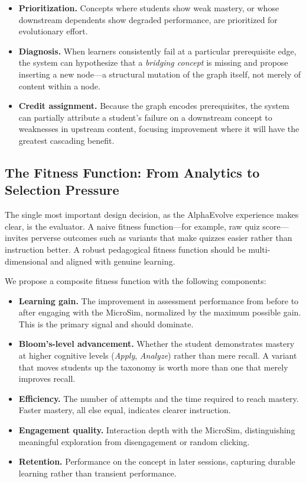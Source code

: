 \begin{itemize}
    \item \textbf{Prioritization.} Concepts where students show weak mastery,
          or whose downstream dependents show degraded performance, are
          prioritized for evolutionary effort.
    \item \textbf{Diagnosis.} When learners consistently fail at a particular
          prerequisite edge, the system can hypothesize that a
          \textit{bridging concept} is missing and propose inserting a new
          node---a structural mutation of the graph itself, not merely of
          content within a node.
    \item \textbf{Credit assignment.} Because the graph encodes prerequisites,
          the system can partially attribute a student's failure on a downstream
          concept to weaknesses in upstream content, focusing improvement where
          it will have the greatest cascading benefit.
\end{itemize}

\subsection{The Fitness Function: From Analytics to Selection Pressure}
\label{sec:fitness}

The single most important design decision, as the AlphaEvolve experience makes
clear, is the evaluator. A naive fitness function---for example, raw quiz
score---invites perverse outcomes such as variants that make quizzes easier
rather than instruction better. A robust pedagogical fitness function should be
multi-dimensional and aligned with genuine learning.

We propose a composite fitness function with the following components:

\begin{itemize}
    \item \textbf{Learning gain.} The improvement in assessment performance
          from before to after engaging with the MicroSim, normalized by the
          maximum possible gain. This is the primary signal and should dominate.
    \item \textbf{Bloom's-level advancement.} Whether the student demonstrates
          mastery at higher cognitive levels (\textit{Apply}, \textit{Analyze})
          rather than mere recall. A variant that moves students up the taxonomy
          is worth more than one that merely improves recall.
    \item \textbf{Efficiency.} The number of attempts and the time required to
          reach mastery. Faster mastery, all else equal, indicates clearer
          instruction.
    \item \textbf{Engagement quality.} Interaction depth with the MicroSim,
          distinguishing meaningful exploration from disengagement or random
          clicking.
    \item \textbf{Retention.} Performance on the concept in later sessions,
          capturing durable learning rather than transient performance.
\end{itemize}

